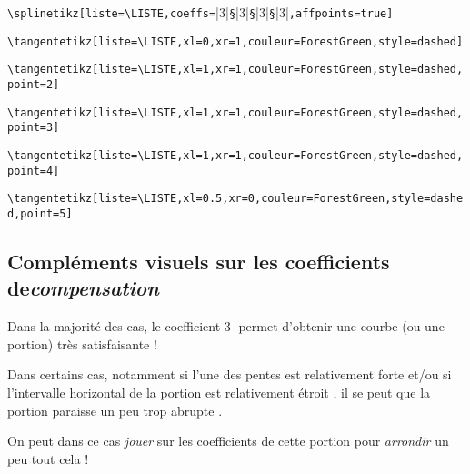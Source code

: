 \documentclass{article}
\begin{document}
{\small \verb|\splinetikz[liste=\LISTE,|\verb|coeffs=|\averb|3|\verb|§|\averb|3|\verb|§|\averb|3|\verb|§|\averb|3|\verb|,|\verb|affpoints=true|\verb|]|}

{\small \verb|\tangentetikz[liste=\LISTE,xl=0,xr=1,couleur=ForestGreen,style=dashed]|}

{\small \verb|\tangentetikz[liste=\LISTE,xl=1,xr=1,couleur=ForestGreen,style=dashed,point=2]|}

{\small \verb|\tangentetikz[liste=\LISTE,xl=1,xr=1,couleur=ForestGreen,style=dashed,point=3]|}

{\small \verb|\tangentetikz[liste=\LISTE,xl=1,xr=1,couleur=ForestGreen,style=dashed,point=4]|}

{\small \verb|\tangentetikz[liste=\LISTE,xl=0.5,xr=0,couleur=ForestGreen,style=dashed,point=5]|}

\newpage

\subsection{Compléments visuels sur les coefficients de\textit{compensation}}

Dans la majorité des cas, le coefficient \textcircled{3} permet d'obtenir une courbe (ou une portion) très satisfaisante !

Dans certains cas, notamment si l'une des pentes est relativement \og forte \fg{} et/ou si l'intervalle horizontal de la portion est relativement \og étroit \fg, il se peut que la portion paraisse un peu trop \og abrupte \fg{}.

On peut dans ce cas \textit{jouer} sur les coefficients de cette portion pour \textit{arrondir} un peu tout cela !
\end{document}
